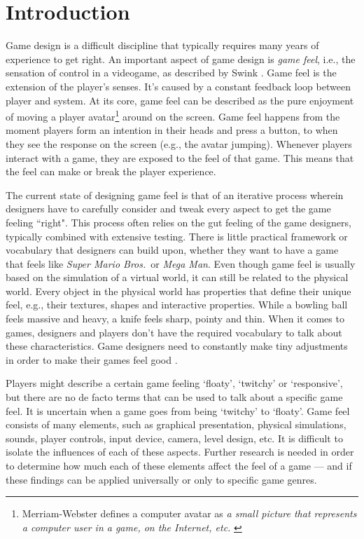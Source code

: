 \section{Introduction}
Game design is a difficult discipline that typically requires many years of experience to get right. An important aspect of game design is \textit{game feel}, i.e., the sensation of control in a videogame, as described by Swink \cite{swink}. Game feel is the extension of the player's senses. It's caused by a constant feedback loop between player and system. At its core, game feel can be described as the pure enjoyment of moving a player avatar\footnote{Merriam-Webster defines a computer avatar as \textit{a small picture that represents a computer user in a game, on the Internet, etc.} \cite{avatar}} around on the screen. Game feel happens from the moment players form an intention in their heads and press a button, to when they see the response on the screen (e.g., the avatar jumping). Whenever players interact with a game, they are exposed to the feel of that game. This means that the feel can make or break the player experience.

The current state of designing game feel is that of an iterative process wherein designers have to carefully consider and tweak every aspect to get the game feeling ``right". This process often relies on the gut feeling of the game designers, typically combined with extensive testing. There is little practical framework or vocabulary that designers can build upon, whether they want to have a game that feels like \textit{Super Mario Bros.}\ or \textit{Mega Man}. Even though game feel is usually based on the simulation of a virtual world, it can still be related to the physical world. Every object in the physical world has properties that define their unique feel, e.g., their textures, shapes and interactive properties. While a bowling ball feels massive and heavy, a knife feels sharp, pointy and thin. When it comes to games, designers and players don't have the required vocabulary to talk about these characteristics. Game designers need to constantly make tiny adjustments in order to make their games feel good \cite{meatboy1, meatboy2, juicyBeast, platformer_controls, gameFeelTips}.

Players might describe a certain game feeling `floaty', `twitchy' or `responsive', but there are no de facto terms that can be used to talk about a specific game feel. It is uncertain when a game goes from being `twitchy' to `floaty'. Game feel consists of many elements, such as graphical presentation, physical simulations, sounds, player controls, input device, camera, level design, etc. It is difficult to isolate the influences of each of these aspects. Further research is needed in order to determine how much each of these elements affect the feel of a game --- and if these findings can be applied universally or only to specific game genres.

